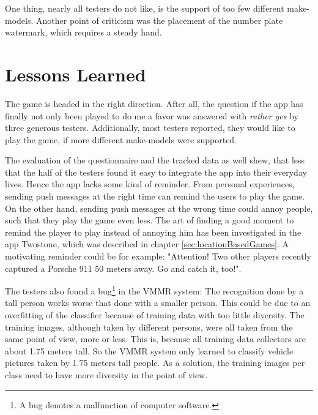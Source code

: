 One thing, nearly all testers do not like, is the support of too few different make-models. Another point of criticism was the placement of the number plate watermark, which requires a steady hand.


\section{Lessons Learned}
The game is headed in the right direction. After all, the question if the app has finally not only been played to do me a favor was answered with \emph{rather yes} by three generous testers. Additionally, most testers reported, they would like to play the game, if more different make-models were supported.

The evaluation of the questionnaire and the tracked data as well shew, that less that the half of the testers found it easy to integrate the app into their everyday lives. Hence the app lacks some kind of reminder. From personal experiences, sending push messages at the right time can remind the users to play the game. On the other hand, sending push messages at the wrong time could annoy people, such that they play the game even less. The art of finding a good moment to remind the player to play instead of annoying him has been investigated in the app Twostone, which was described in chapter \ref{sec:locationBasedGames}. A motivating reminder could be for example: "Attention! Two other players recently captured a Porsche 911 50 meters away. Go and catch it, too!".

The testers also found a bug\footnote{A bug denotes a malfunction of computer software.} in the VMMR system: The recognition done by a tall person works worse that done with a smaller person. This could be due to an overfitting of the classifier because of training data with too little diversity. The training images, although taken by different persons, were all taken from the same point of view, more or less. This is, because all training data collectors are about 1.75 meters tall. So the VMMR system only learned to classify vehicle pictures taken by 1.75 meters tall people. As a solution, the training images per class need to have more diversity in the point of view.

